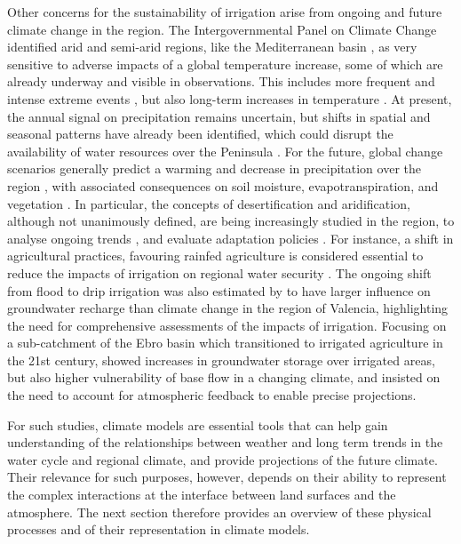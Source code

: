 Other concerns for the sustainability of irrigation arise from ongoing and future climate change in the region. The Intergovernmental Panel on Climate Change 
\citep{RN1} identified arid and semi-arid regions, like the Mediterranean basin \citep{giorgi_climate_2006}, as very sensitive to adverse impacts of a global temperature increase, some of which are already underway and visible in observations.
This includes more frequent and intense extreme events \citep{dominguez-castro_high_2019}, but also long-term increases in temperature \citep{pena-angulo_seasonal_2021,gonzalez-hidalgo_variability_2022}. At present, the annual signal on precipitation remains uncertain, but shifts in spatial and seasonal patterns have already been identified, which could disrupt the availability of water resources over the Peninsula \citep{gonzalez-hidalgo_seasonal_2024}. 
For the future, global change scenarios generally predict a warming and decrease in precipitation over the region \citep{pereira_temperature_2021}, with associated consequences on soil moisture, evapotranspiration, and vegetation \citep{RN1, nunes_effects_2023}.
In particular, the concepts of desertification and aridification, although not unanimously defined, are being increasingly studied in the region, to analyse ongoing trends \citep{paniagua_aridity_2019, begueria_aridity_2025}, and evaluate adaptation policies \citep{van_leeuwen_evolution_2019, MITECO2022}. For instance, a shift in agricultural practices, favouring rainfed agriculture is considered essential to reduce the impacts of irrigation on regional water security \citep{eekhout_how_2024}. The ongoing shift from flood to drip irrigation was also estimated by \citet{pool_flood_2021} to have larger influence on groundwater recharge than climate change in the region of Valencia, highlighting the need for comprehensive assessments of the impacts of irrigation. Focusing on a sub-catchment of the Ebro basin which transitioned to irrigated agriculture in the 21st century, \citet{von_gunten_estimating_2015} showed increases in groundwater storage over irrigated areas, but also higher vulnerability of base flow in a changing climate, and insisted on the need to account for atmospheric feedback to enable precise projections.

For such studies, climate models are essential tools that can help gain understanding of the relationships between weather and long term trends in the water cycle and regional climate, and provide projections of the future climate. Their relevance for such purposes, however, depends on their ability to represent the complex interactions at the interface between land surfaces and the atmosphere. The next section therefore provides an overview of these physical processes and of their representation in climate models.

